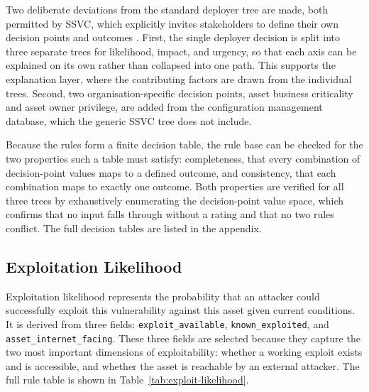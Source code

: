 Two deliberate deviations from the standard deployer tree are made, both permitted by SSVC, which explicitly invites stakeholders to define their own decision points and outcomes \cite{spring2021ssvc}. First, the single deployer decision is split into three separate trees for likelihood, impact, and urgency, so that each axis can be explained on its own rather than collapsed into one path. This supports the explanation layer, where the contributing factors are drawn from the individual trees. Second, two organisation-specific decision points, asset business criticality and asset owner privilege, are added from the configuration management database, which the generic SSVC tree does not include.

Because the rules form a finite decision table, the rule base can be checked for the two properties such a table must satisfy: completeness, that every combination of decision-point values maps to a defined outcome, and consistency, that each combination maps to exactly one outcome. Both properties are verified for all three trees by exhaustively enumerating the decision-point value space, which confirms that no input falls through without a rating and that no two rules conflict. The full decision tables are listed in the appendix.

\subsection{Exploitation Likelihood}
\label{subsec:exploit-likelihood}

Exploitation likelihood represents the probability that an attacker could successfully exploit this vulnerability against this asset given current conditions. It is derived from three fields: \texttt{exploit\_available}, \texttt{known\_exploited}, and \texttt{asset\_internet\_facing}. These three fields are selected because they capture the two most important dimensions of exploitability: whether a working exploit exists and is accessible, and whether the asset is reachable by an external attacker. The full rule table is shown in Table~\ref{tab:exploit-likelihood}.

